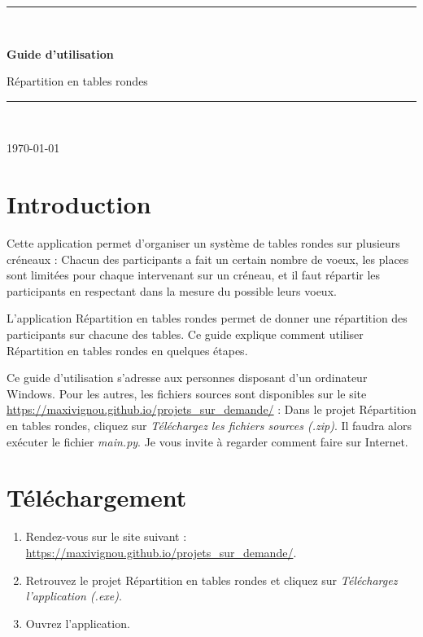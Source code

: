 \documentclass[11pt,a4paper]{article}
\newcommand{\nomproduit}{Répartition en tables rondes}
\begin{document}
\begin{titlepage}
  \centering
  \vspace*{4cm}
  {\color{principale}\rule{\linewidth}{1.5pt}}\\[0.8cm]
  {\Huge\bfseries\color{principale} Guide d'utilisation\par}
  \vspace{0.5cm}
  {\LARGE \nomproduit\par}
  \vspace{0.4cm}
  {\color{principale}\rule{\linewidth}{1.5pt}}\\[2cm]
  {\large \today\par}
\end{titlepage}

\tableofcontents
\clearpage

\section{Introduction}
\label{sec:introduction}
Cette application permet d'organiser un système de tables rondes sur plusieurs créneaux : Chacun des participants a fait un certain nombre de voeux, les places sont limitées pour chaque intervenant sur un créneau, et il faut répartir les participants en respectant dans la mesure du possible leurs voeux.

L'application \nomproduit{} permet de donner une répartition des participants sur chacune des tables.
Ce guide explique comment utiliser \nomproduit{} en quelques étapes.

\begin{note}
Ce guide d'utilisation s'adresse aux personnes disposant d'un ordinateur Windows. Pour les autres, les fichiers sources sont disponibles sur le site \url{https://maxivignou.github.io/projets_sur_demande/} : Dans le projet \nomproduit{}, cliquez sur \textit{Téléchargez les fichiers sources (.zip)}. Il faudra alors exécuter le fichier \textit{main.py}. Je vous invite à regarder comment faire sur Internet.
\end{note}

\section{Téléchargement}
\label{sec:telechargement}
\begin{enumerate}
  \item Rendez-vous sur le site suivant : \url{https://maxivignou.github.io/projets_sur_demande/}.
  \item Retrouvez le projet \nomproduit{} et cliquez sur \textit{Téléchargez l'application (.exe)}.
  \item Ouvrez l'application.
\end{enumerate}
\end{document}

